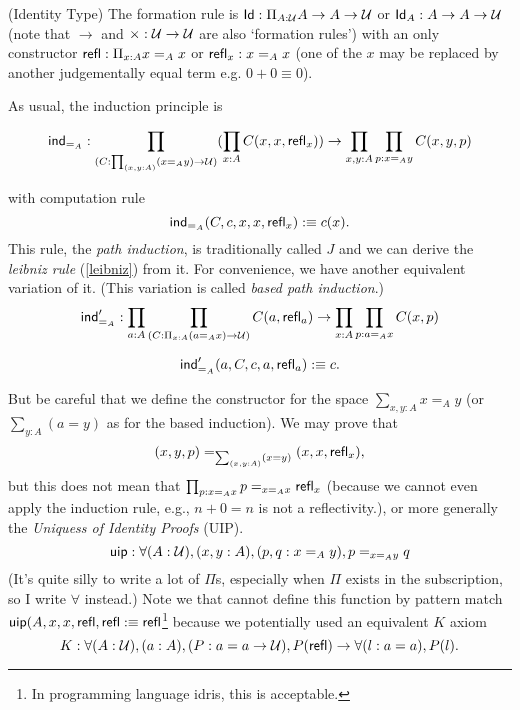 \begin{definition}
    \label{identity-type}
    (Identity Type) The formation rule is 
    $\text{\sf Id}: \Pi_{A:\mathcal{U}}A\to A\to\mathcal{U}$ or $\text{\sf Id}_A: A\to A\to \mathcal{U}$ 
    (note that $\to$ and $\times: \mathcal{U}\to\mathcal{U}$ are also 
    `formation rules') with an only constructor 
    $\text{\sf refl}:\Pi_{x:A}x=_A x$ or $\text{\sf refl}_x: x=_A x$ (one of the $x$ may
    be replaced by another judgementally equal term e.g. $0+0\equiv 0$).
\end{definition}

As usual, the induction principle is

\begin{equation}
    \label{ind_id}
    \text{\sf ind}_{=_A}:\prod_{(C:\prod_{(x,y:A)}(x=_A y)\to\mathcal{U})}
    (\prod_{x:A}C(x,x,\text{\sf refl}_x))\to\prod_{x,y:A}\prod_{p:x=_A y}C(x,y,p)
\end{equation}

with computation rule
$$
    \text{\sf ind}_{=_A}(C,c,x,x,\text{\sf refl}_x):\equiv c(x).
$$
This rule, the {\it path induction}, is traditionally called $J$ and we 
can derive the {\it leibniz rule} (\autoref{leibniz}) from it. For 
convenience, we have another equivalent variation of it. (This variation 
is called {\it based path induction}.)
$$
    \text{\sf ind}'_{=_A}:\prod_{a:A}\prod_{(C:\Pi_{x:A}(a=_A x)\to \mathcal{U})}
    C(a, \text{\sf refl}_a) \to \prod_{x:A}\prod_{p:a=_A x}C(x, p)
$$

$$
    \text{\sf ind}'_{=_A}(a, C, c, a,\text{\sf refl}_a) :\equiv c.
$$

But be careful that we define the constructor for the space 
$\sum_{x,y:A}x=_A y$ (or $\sum_{y:A}(a=y)$ as for the based induction).
We may prove that $$(x,y,p)=_{\sum_{(x,y:A)}(x=y)}(x,x,\text{\sf refl}_x),$$ but
this does not mean that $\prod_{p:x=_A x}p=_{x=_Ax}\text{\sf refl}_x$ (because
we cannot even apply the induction rule, e.g., $n+0=n$ is not a 
reflectivity.), or more generally the {\it
Uniquess of Identity Proofs} (UIP).
\newcommand{\uip}{\name{uip}}
\begin{equation}
    \label{uip}
    \uip: \forall (A: \universe), (x,y:A), (p,q:x=_A y),p=_{x=_A y}q
\end{equation}
(It's quite silly to write a lot of $\Pi$s, especially when $\Pi$ exists
in the subscription, so I write $\forall$ instead.)
Note we that cannot define this function by pattern match 
$\uip(A,x,x,\refl,\refl\defn\refl$\footnote{In programming language
idris, this is acceptable.} because we potentially used an
equivalent $K$ axiom \cite{pattern-matching-without-K}
\begin{equation}
    \label{K-axiom}
    K: \forall (A:\mathcal{U}), (a:A), (P: a=a\to\mathcal{U}),
    P(\text{\sf refl})\to\forall (l: a = a), P(l).
\end{equation}

